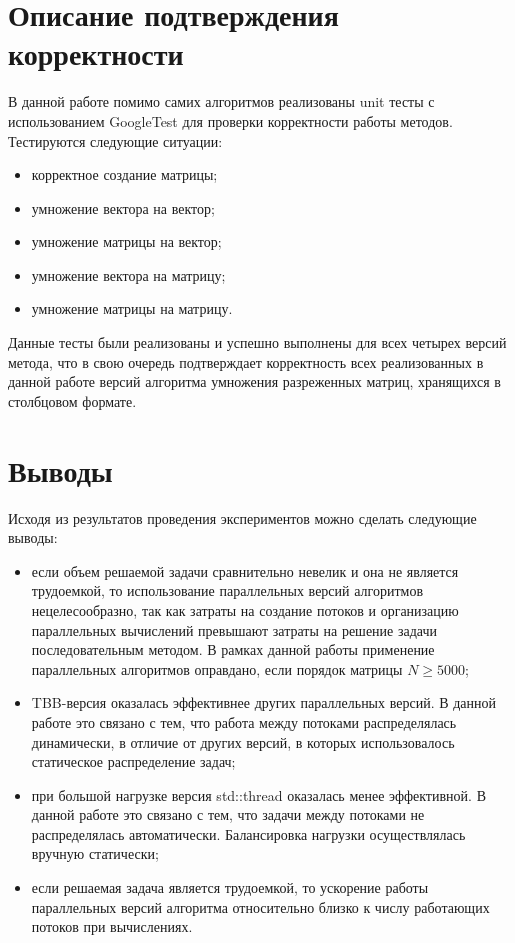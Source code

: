 \documentclass{report}
\begin{document}
\section*{Описание подтверждения корректности}
\par В данной работе помимо самих алгоритмов реализованы unit тесты с использованием GoogleTest для проверки корректности работы методов. Тестируются следующие ситуации:
\begin{itemize}
	\item корректное создание матрицы;
	\item умножение вектора на вектор;
	\item умножение матрицы на вектор;
	\item умножение вектора на матрицу;
	\item умножение матрицы на матрицу.
\end{itemize}
\par Данные тесты были реализованы и успешно выполнены для всех четырех версий метода, что в свою очередь подтверждает корректность всех реализованных в данной работе версий алгоритма умножения разреженных матриц, хранящихся в столбцовом формате.
\newpage

\section*{Выводы}
\par Исходя из результатов проведения экспериментов можно сделать следующие выводы:
\begin{itemize}
	\item если объем решаемой задачи сравнительно невелик и она не является трудоемкой, то использование параллельных версий алгоритмов нецелесообразно, так как затраты на создание потоков и организацию параллельных вычислений превышают затраты на решение задачи последовательным методом. В рамках данной работы применение параллельных алгоритмов оправдано, если порядок матрицы $N \ge 5000$;
	\item TBB-версия оказалась эффективнее других параллельных версий. В данной работе это связано с тем, что работа между потоками распределялась динамически, в отличие от других версий, в которых использовалось статическое распределение задач;
	\item при большой нагрузке версия std::thread оказалась менее эффективной. В данной работе это связано с тем, что задачи между потоками не распределялась автоматически. Балансировка нагрузки осуществлялась вручную статически;
	\item если решаемая задача является трудоемкой, то ускорение работы параллельных версий алгоритма относительно близко к числу работающих потоков при вычислениях.
\end{itemize}
\newpage
\end{document}
